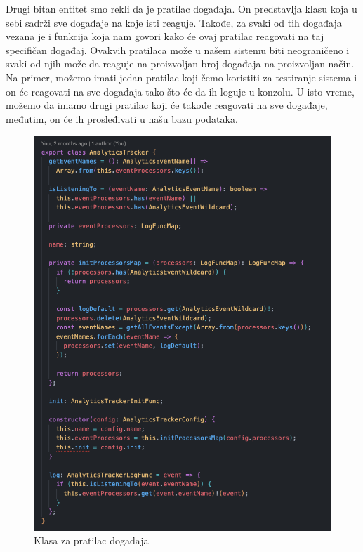 \documentclass[12pt,oneside]{memoir}
\begin{document}
Drugi bitan entitet smo rekli da je pratilac događaja. On predstavlja klasu koja u sebi sadrži sve događaje na koje isti reaguje. Takođe, za svaki od tih događaja vezana je i funkcija koja nam govori kako će ovaj pratilac reagovati na taj specifičan događaj. Ovakvih pratilaca može u našem sistemu biti neograničeno i svaki od njih može da reaguje na proizvoljan broj događaja na proizvoljan način. Na primer, možemo imati jedan pratilac koji čemo koristiti za testiranje sistema i on će reagovati na sve događaja tako što će da ih loguje u konzolu. U isto vreme, možemo da imamo drugi pratilac koji će takođe reagovati na sve događaje, međutim, on će ih prosleđivati u našu bazu podataka.

\begin{figure}[h!]
\centering
\includegraphics[scale=0.5]{docs/images/chapterSix/analyticsTracker.png}
\caption{Klasa za pratilac događaja}
\label{fig:analyticsTracker}
\end{figure}
\end{document}

